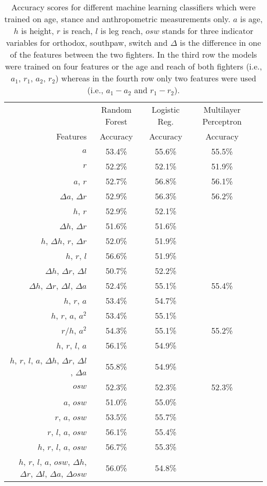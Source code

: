 \begin{center}
\begin{table}[h]
\begin{tabular}{r|cccc}
  \toprule
   & Random Forest & Logistic Reg. & Multilayer Perceptron \\
  Features & Accuracy & Accuracy& Accuracy \\
  \hline
  $a$ & 53.4\% & 55.6\% & 55.5\%\\
  $r$ & 52.2\% & 52.1\% & 51.9\%\\
  $a$, $r$ & 52.7\% & 56.8\% & 56.1\%\\
  $\Delta a$, $\Delta r$ & 52.9\% & 56.3\% & 56.2\%\\
  $h$, $r$ & 52.9\%  & 52.1\% & \\
  $\Delta h$, $\Delta r$ & 51.6\% & 51.6\%  &\\
  $h$, $\Delta h$, $r$, $\Delta r$ & 52.0\% & 51.9\%  &\\
  $h$, $r$, $l$ & 56.6\% & 51.9\% &  \\
  $\Delta h$, $\Delta r$, $\Delta l$ & 50.7\% & 52.2\%  &\\
  $\Delta h$, $\Delta r$, $\Delta l$, $\Delta a$ & 52.4\% & 55.1\% & 55.4\% \\
  $h$, $r$, $a$ & 53.4\% & 54.7\% &  \\
  $h$, $r$, $a$, $a^2$ & 53.4\% & 55.1\% &  \\
  $r/h$, $a^2$ & 54.3\% & 55.1\% & 55.2\%  \\
  $h$, $r$, $l$, $a$ & 56.1\% & 54.9\% &  \\
  $h$, $r$, $l$, $a$, $\Delta h$, $\Delta r$, $\Delta l$, $\Delta a$ & 55.8\% & 54.9\%  &\\
  $osw$ & 52.3\% & 52.3\% & 52.3\%\\
  $a$, $osw$ & 51.0\% & 55.0\% & \\
  $r$, $a$, $osw$ & 53.5\% & 55.7\% &  \\
  $r$, $l$, $a$, $osw$ & 56.1\% & 55.4\% & \\
  $h$, $r$, $l$, $a$, $osw$ & 56.7\% & 55.3\% &  \\
  $h$, $r$, $l$, $a$, $osw$, $\Delta h$, $\Delta r$, $\Delta l$, $\Delta a$, $\Delta osw$ & 56.0\% & 54.8\% &  \\
  \bottomrule
\end{tabular}
\caption{Accuracy scores for different machine learning classifiers which were trained
on age, stance and anthropometric measurements only.
$a$ is age, $h$ is height, $r$ is reach, $l$ is leg reach,
$osw$ stands for three indicator variables for orthodox, southpaw,
switch and $\Delta$ is the difference in one of the features between the two
fighters. In the third row the models were trained on
four features or the age and reach of both fighters (i.e., $a_1$, $r_1$, $a_2$, $r_2$)
whereas in the fourth row only two features were used (i.e., $a_1-a_2$ and $r_1-r_2$).}
\label{anthropomorphic_features}
\end{table}
\end{center}

